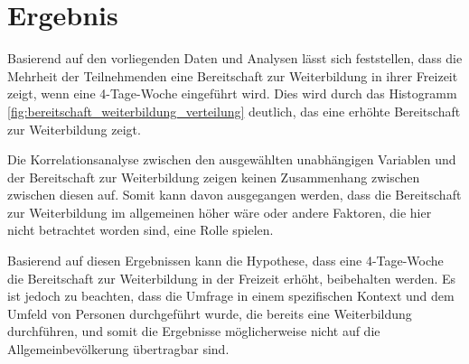 


\section{Ergebnis}

Basierend auf den vorliegenden Daten und Analysen lässt sich feststellen, dass die Mehrheit der Teilnehmenden eine 
Bereitschaft zur Weiterbildung in ihrer Freizeit zeigt, wenn eine 4-Tage-Woche eingeführt wird. Dies wird durch das 
Histogramm \ref{fig:bereitschaft_weiterbildung_verteilung} deutlich, das eine erhöhte Bereitschaft zur Weiterbildung 
zeigt.

Die Korrelationsanalyse zwischen den ausgewählten unabhängigen Variablen und der Bereitschaft zur Weiterbildung zeigen
keinen Zusammenhang zwischen zwischen diesen auf. Somit kann davon ausgegangen werden, dass die Bereitschaft zur
Weiterbildung im allgemeinen höher wäre oder andere Faktoren, die hier nicht betrachtet worden sind, eine Rolle spielen.




Basierend auf diesen Ergebnissen kann die Hypothese, dass eine 4-Tage-Woche die Bereitschaft zur Weiterbildung in der 
Freizeit erhöht, beibehalten werden. Es ist jedoch zu beachten, dass die Umfrage in einem spezifischen Kontext und 
dem Umfeld von Personen durchgeführt wurde, die bereits eine Weiterbildung durchführen, 
und somit die Ergebnisse möglicherweise nicht auf die Allgemeinbevölkerung übertragbar sind.

